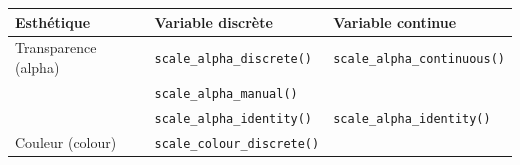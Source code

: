 \documentclass[
  11pt,
]{book}
\numberwithin{equation}{section}
\numberwithin{countremarque}{section}
\begin{document}
\begin{longtable}[]{@{}lll@{}}
\toprule
\begin{minipage}[b]{0.22\columnwidth}\raggedright
Esthétique\strut
\end{minipage} & \begin{minipage}[b]{0.35\columnwidth}\raggedright
Variable discrète\strut
\end{minipage} & \begin{minipage}[b]{0.35\columnwidth}\raggedright
Variable continue\strut
\end{minipage}\tabularnewline
\midrule
\endhead
\begin{minipage}[t]{0.22\columnwidth}\raggedright
Transparence (alpha)\strut
\end{minipage} & \begin{minipage}[t]{0.35\columnwidth}\raggedright
\texttt{scale\_alpha\_discrete()}\strut
\end{minipage} & \begin{minipage}[t]{0.35\columnwidth}\raggedright
\texttt{scale\_alpha\_continuous()}\strut
\end{minipage}\tabularnewline
\begin{minipage}[t]{0.22\columnwidth}\raggedright
\strut
\end{minipage} & \begin{minipage}[t]{0.35\columnwidth}\raggedright
\texttt{scale\_alpha\_manual()}\strut
\end{minipage} & \begin{minipage}[t]{0.35\columnwidth}\raggedright
\strut
\end{minipage}\tabularnewline
\begin{minipage}[t]{0.22\columnwidth}\raggedright
\strut
\end{minipage} & \begin{minipage}[t]{0.35\columnwidth}\raggedright
\texttt{scale\_alpha\_identity()}\strut
\end{minipage} & \begin{minipage}[t]{0.35\columnwidth}\raggedright
\texttt{scale\_alpha\_identity()}\strut
\end{minipage}\tabularnewline
\begin{minipage}[t]{0.22\columnwidth}\raggedright
Couleur (colour)\strut
\end{minipage} & \begin{minipage}[t]{0.35\columnwidth}\raggedright
\texttt{scale\_colour\_discrete()}\strut
\end{minipage} & \begin{minipage}[t]{0.35\columnwidth}\raggedright

\end{minipage}
\end{longtable}
\end{document}
